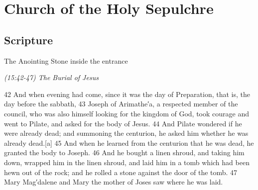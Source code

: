 \documentclass[letterpaper]{report}
\begin{document}
\clearpage
\section{Church of the Holy Sepulchre}
\begin{multicols}{2}
	\mbox{}
\end{multicols}
\subsection{Scripture}
{\centering
	The Anointing Stone inside the entrance
	
	\emph{(15:42-47) The Burial of Jesus}\\
}
\begin{multicols}{2}
	42 And when evening had come, since it was the day of Preparation, that is, the day before the sabbath, 43 Joseph of Arimathe′a, a respected member of the council, who was also himself looking for the kingdom of God, took courage and went to Pilate, and asked for the body of Jesus. 44 And Pilate wondered if he were already dead; and summoning the centurion, he asked him whether he was already dead.[a] 45 And when he learned from the centurion that he was dead, he granted the body to Joseph. 46 And he bought a linen shroud, and taking him down, wrapped him in the linen shroud, and laid him in a tomb which had been hewn out of the rock; and he rolled a stone against the door of the tomb. 47 Mary Mag′dalene and Mary the mother of Joses saw where he was laid.
\end{multicols}
\end{document}
